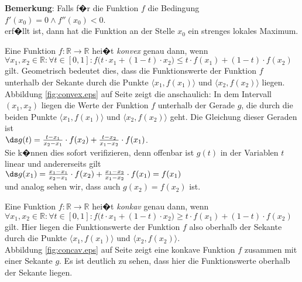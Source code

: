 \noindent
\textbf{Bemerkung}: Falls f�r die Funktion $f$ die Bedingung
\\[0.2cm]
\hspace*{1.3cm}
$f'(x_0) = 0 \wedge f''(x_0) < 0$.
\\[0.2cm]
erf�llt ist, dann hat die Funktion an der Stelle $x_0$ ein strenges lokales Maximum. \eox

\begin{Definition}
Eine Funktion $f:\mathbb{R} \rightarrow \mathbb{R}$ hei�t \emph{konvex} genau dann, wenn 
\\[0.2cm]
\hspace*{1.3cm}
$\forall x_1,x_2 \in \mathbb{R}:\forall t\in [0,1]: 
  f\bigl(t \cdot x_1 + (1-t)\cdot x_2\bigr) \leq t \cdot f(x_1) + (1 - t) \cdot f(x_2)
$
\\[0.2cm]
gilt.  Geometrisch bedeutet dies, dass die Funktionswerte der Funktion $f$  unterhalb
der Sekante durch die Punkte 
$\bigl\langle x_1, f(x_1) \bigl\rangle$ und $\bigl\langle x_2, f(x_2) \bigl\rangle$
liegen.  Abbildung \ref{fig:convex.eps} auf Seite \pageref{fig:convex.eps} zeigt die anschaulich: 
In dem Intervall $(x_1,x_2)$ liegen die Werte der Funktion $f$ unterhalb der Gerade $g$, die durch die beiden Punkte 
$\langle x_1, f(x_1)\rangle$ und $\langle x_2, f(x_2)\rangle$ geht.  Die Gleichung dieser Geraden
ist 
\\[0.2cm]
\hspace*{1.3cm}
$\ds g(t) = \frac{t-x_1}{x_2-x_1}\cdot f(x_2) + \frac{t-x_2}{x_1-x_2}\cdot f(x_1)$.
\\[0.2cm]
Sie k�nnen dies sofort verifizieren, denn offenbar ist $g(t)$ in der Variablen $t$ linear und
andererseits gilt
\\[0.2cm]
\hspace*{1.3cm}
$\ds g(x_1) = \frac{x_1-x_1}{x_2-x_1}\cdot f(x_2)+\frac{x_1-x_2}{x_1-x_2}\cdot f(x_1) = f(x_1)$
\\[0.2cm]
und analog sehen wir, dass auch $g(x_2) = f(x_2)$ ist.
\vspace*{0.2cm}

Eine Funktion $f:\mathbb{R} \rightarrow \mathbb{R}$ hei�t \emph{konkav} genau dann, wenn 
\\[0.2cm]
\hspace*{1.3cm}
$\forall x_1,x_2 \in \mathbb{R}:\forall t\in [0,1]: 
  f\bigl(t \cdot x_1 + (1-t)\cdot x_2\bigr) \geq t \cdot f(x_1) + (1 - t) \cdot f(x_2)
$
\\[0.2cm]
gilt.  Hier liegen die Funktionswerte der Funktion $f$ also oberhalb 
der Sekante durch die Punkte 
$\bigl\langle x_1, f(x_1) \bigl\rangle$ und $\bigl\langle x_2, f(x_2) \bigl\rangle$.
\\[0.2cm]
Abbildung \ref{fig:concav.eps} auf Seite \pageref{fig:concav.eps} zeigt eine konkave Funktion $f$
zusammen mit einer Sekante $g$.  Es ist deutlich zu sehen, dass hier die Funktionswerte oberhalb der
Sekante liegen.
\eod
\end{Definition}

